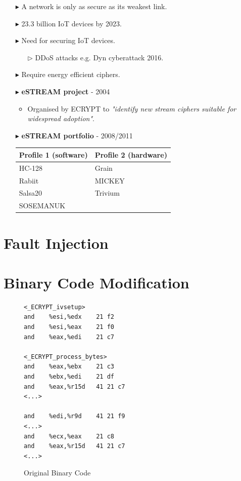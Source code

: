 \documentclass[conference]{IEEEtran}
\begin{document}
\begin{itemize}
\item[$\blacktriangleright$] A network is only as secure as its weakest link.
\item[$\blacktriangleright$] 23.3 billion IoT devices by 2023.
\item[$\blacktriangleright$] Need for securing IoT devices.
\begin{itemize}[itemsep=0.25cm]
\item[$\triangleright$] DDoS attacks e.g. Dyn cyberattack 2016.
\end{itemize}
\item[$\blacktriangleright$] Require energy efficient ciphers.
\end{itemize}

\begin{itemize}
\item[$\blacktriangleright$] \textbf{eSTREAM project} - 2004
\begin{itemize}
\item Organised by ECRYPT to \textit{"identify new stream ciphers suitable for widespread adoption"}.
\end{itemize}
\item[$\blacktriangleright$] \textbf{eSTREAM portfolio} - 2008/2011
\begin{tabular}{l|l}
Profile 1 (software) & Profile 2 (hardware)\\\hline
HC-128 & Grain\\
Rabiit & MICKEY\\
Salsa20 & Trivium\\
SOSEMANUK &
\end{tabular}
\end{itemize}

\section{Fault Injection}

\section{Binary Code Modification}

\begin{figure}
\begin{lstlisting}[style=asm, frame=tlrb]
<_ECRYPT_ivsetup>
and    %esi,%edx    21 f2
and    %esi,%eax    21 f0
and    %eax,%edi    21 c7

<_ECRYPT_process_bytes>
and    %eax,%ebx    21 c3
and    %ebx,%edi    21 df  
and    %eax,%r15d   41 21 c7
<...>

and    %edi,%r9d    41 21 f9
<...>
and    %ecx,%eax    21 c8
and    %eax,%r15d   41 21 c7
<...>
\end{lstlisting}
\caption{Original Binary Code}
\end{figure}
\end{document}
